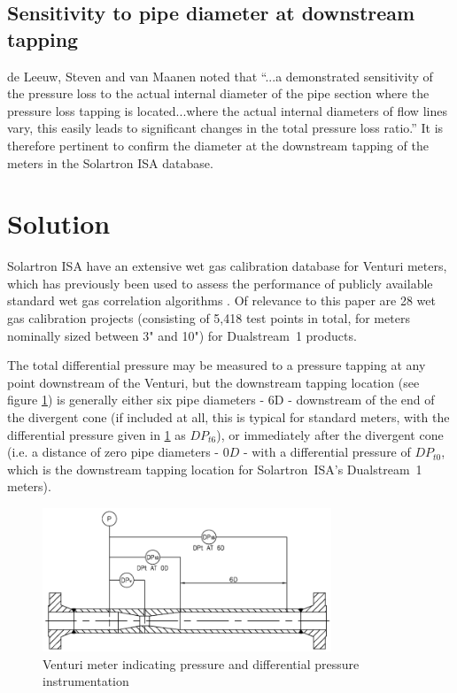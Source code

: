 \documentclass[journal]{IEEEtran}
\begin{document}
\subsection{Sensitivity to pipe diameter at downstream tapping}
de Leeuw, Steven and van Maanen noted that ``...a demonstrated sensitivity of the pressure loss to the actual internal diameter of the pipe section where the pressure loss tapping is located...where the actual internal diameters of flow lines vary, this easily leads to significant changes in the total pressure loss ratio.''  It is therefore pertinent to confirm the diameter at the downstream tapping of the meters in the Solartron ISA database. 

\section{Solution}

Solartron ISA have an extensive wet gas calibration database for Venturi meters, which has previously been used to assess the performance of publicly available standard wet gas correlation algorithms \cite{Collins2015}.  Of relevance to this paper are 28 wet gas calibration projects (consisting of 5,418 test points in total, for meters nominally sized between 3" and 10") for Dualstream~1 products.

The total differential pressure may be measured to a pressure tapping at any point downstream of the Venturi, but the downstream tapping location (see figure \ref{fig:Venturi}) is generally either six pipe diameters - $6$\acrshort{D} - downstream of the end of the divergent cone (if included at all, this is typical for standard meters, with the differential pressure given in \ref{fig:Venturi} as $DP_{t6}$), or immediately after the divergent cone (i.e. a distance of zero pipe diameters - $0D$ - with a differential pressure of $DP_{t0}$, which is the downstream tapping location for Solartron~ISA's Dualstream~1 meters).

\begin{figure}[ht]
\centering
\includegraphics[width=3.4in]{Venturi.png}
\caption[]{ Venturi meter indicating pressure and differential pressure\\instrumentation }
\label{fig:Venturi}
\end{figure}
\end{document}

